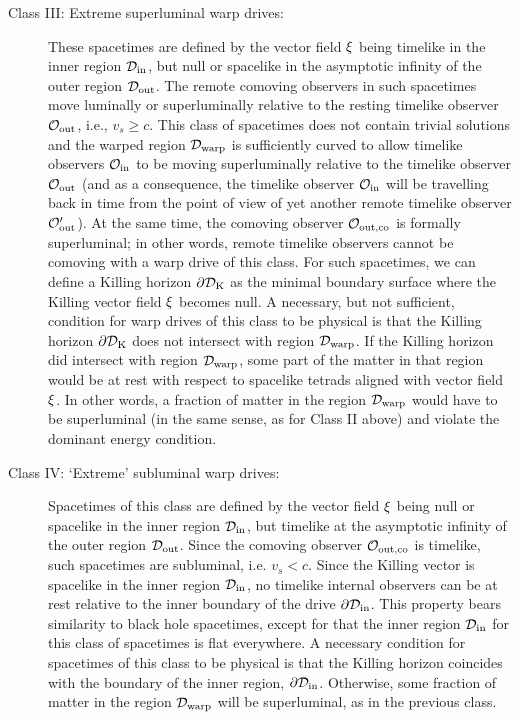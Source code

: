 \documentclass[10pt]{iopart}
\begin{document}
\begin{description}
    \item[Class III: Extreme superluminal warp drives:] These spacetimes are defined by the vector field ${\bf \xi}$ being timelike in the inner region $\mathcal{D}_{\rm in}$, but null or spacelike in the asymptotic infinity of the outer region $\mathcal{D}_{\rm out}$. The remote comoving observers in such spacetimes move luminally or superluminally relative to the resting timelike observer $\mathcal{O}_{\rm out}$, i.e., $v_s\geq c$. This class of spacetimes does not contain trivial solutions and the warped region $\mathcal{D}_{\rm warp}$ is sufficiently curved to allow timelike observers $\mathcal{O}_{\rm in}$ to be moving superluminally relative to the timelike observer $\mathcal{O}_{\rm out}$ (and as a consequence, the timelike observer $\mathcal{O}_{\rm in}$ will be travelling back in time from the point of view of yet another remote timelike observer $\mathcal{O}_{\rm out}^\prime$). At the same time, the comoving observer $\mathcal{O}_{\rm out, co}$ is formally superluminal; in other words, remote timelike observers cannot be comoving with a warp drive of this class. For such spacetimes, we can define a Killing horizon $\partial\mathcal{D}_{\rm K}$ as the minimal boundary surface where the Killing vector field ${\bf \xi}$  becomes null. A necessary, but not sufficient, condition for warp drives of this class to be physical is that the Killing horizon $\partial\mathcal{D}_{\rm K}$ does not intersect with region $\mathcal{D}_{\rm warp}$. If the Killing horizon did intersect with region $\mathcal{D}_{\rm warp}$, some part of the matter in that region would be at rest with respect to spacelike tetrads aligned with vector field ${\bf \xi}$. In other words, a fraction of matter in the region $\mathcal{D}_{\rm warp}$ would have to be superluminal (in the same sense, as for Class II above) and violate the dominant energy condition.
    
    \item[Class IV: `Extreme' subluminal warp drives:] Spacetimes of this class are defined by the vector field  ${\bf \xi}$ being null or spacelike in the inner region $\mathcal{D}_{\rm in}$, but timelike at the asymptotic infinity of the outer region $\mathcal{D}_{\rm out}$. Since the comoving observer $\mathcal{O}_{\rm out, co}$ is timelike, such spacetimes are subluminal, i.e. $v_s < c$. Since the Killing vector is spacelike in the inner region $\mathcal{D}_{\rm in}$, no timelike internal observers can be at rest relative to the inner boundary of the drive $\partial\mathcal{D}_{\rm in}$. This property bears similarity to black hole spacetimes, except for that the inner region $\mathcal{D}_{\rm in}$ for this class of spacetimes is flat everywhere. A necessary condition for spacetimes of this class to be physical is that the Killing horizon coincides with the boundary of the inner region, $\partial\mathcal{D}_{\rm in}$. Otherwise, some fraction of matter in the region $\mathcal{D}_{\rm warp}$ will be superluminal, as in the previous class.
\end{description}
\end{document}
